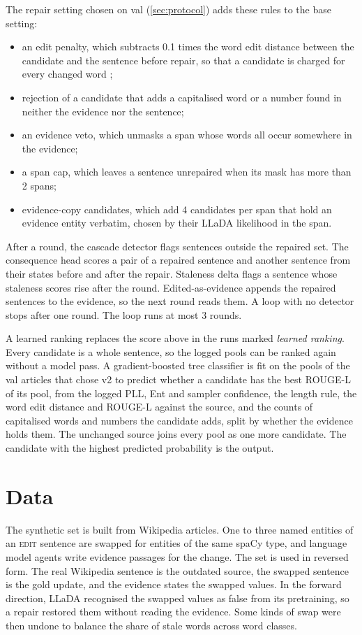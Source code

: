\documentclass[]{paper}
\newcommand{\edit}{\textsc{edit}}
\begin{document}
The repair setting chosen on val (\cref{sec:protocol}) adds these rules to the base setting:
\begin{itemize}
\item an edit penalty, which subtracts 0.1 times the word edit distance between the candidate and the sentence before repair, so that a candidate is charged for every changed word \citep{chen-etal-2022-converge};
\item rejection of a candidate that adds a capitalised word or a number found in neither the evidence nor the sentence;
\item an evidence veto, which unmasks a span whose words all occur somewhere in the evidence;
\item a span cap, which leaves a sentence unrepaired when its mask has more than 2 spans;
\item evidence-copy candidates, which add 4 candidates per span that hold an evidence entity verbatim, chosen by their LLaDA likelihood in the span.
\end{itemize}

After a round, the cascade detector flags sentences outside the repaired set. The consequence head scores a pair of a repaired sentence and another sentence from their states before and after the repair. Staleness delta flags a sentence whose staleness scores rise after the round. Edited-as-evidence appends the repaired sentences to the evidence, so the next round reads them. A loop with no detector stops after one round. The loop runs at most 3 rounds.

A learned ranking replaces the score above in the runs marked \emph{learned ranking}. Every candidate is a whole sentence, so the logged pools can be ranked again without a model pass. A gradient-boosted tree classifier is fit on the pools of the val articles that chose v2 to predict whether a candidate has the best ROUGE-L of its pool, from the logged PLL, Ent and sampler confidence, the length rule, the word edit distance and ROUGE-L against the source, and the counts of capitalised words and numbers the candidate adds, split by whether the evidence holds them. The unchanged source joins every pool as one more candidate. The candidate with the highest predicted probability is the output.


\section{Data}
\label{sec:data}

The synthetic set is built from Wikipedia articles. One to three named entities of an \edit{} sentence are swapped for entities of the same spaCy type, and language model agents write evidence passages for the change. The set is used in reversed form. The real Wikipedia sentence is the outdated source, the swapped sentence is the gold update, and the evidence states the swapped values. In the forward direction, LLaDA recognised the swapped values as false from its pretraining, so a repair restored them without reading the evidence. Some kinds of swap were then undone to balance the share of stale words across word classes.
\end{document}
